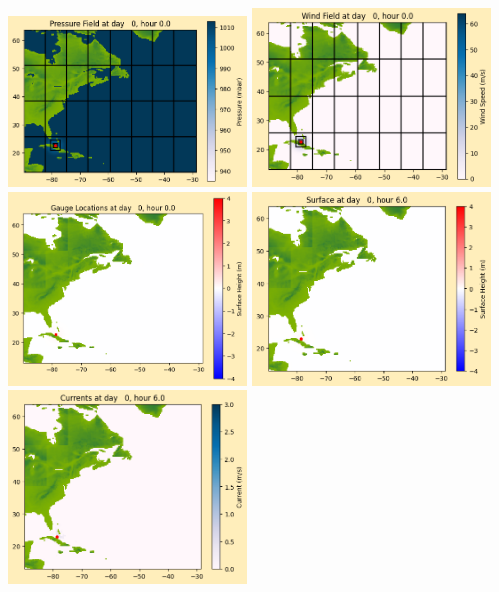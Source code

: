 \documentclass[11pt]{article}
\begin{document}
\includegraphics[width=0.475\textwidth]{frame0012fig1012.png}
\vskip 10pt 
\includegraphics[width=0.475\textwidth]{frame0012fig1013.png}
\includegraphics[width=0.475\textwidth]{frame0012fig1014.png}
\vskip 10pt 
\includegraphics[width=0.475\textwidth]{frame0013fig1001.png}
\includegraphics[width=0.475\textwidth]{frame0013fig1002.png}
\end{document}
